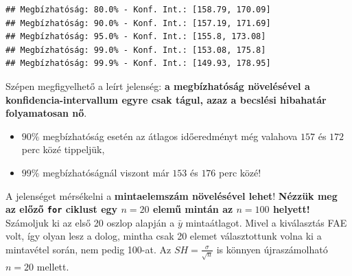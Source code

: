 \documentclass[
]{book}
\providecommand{\tightlist}{%
  \setlength{\itemsep}{0pt}\setlength{\parskip}{0pt}}
\begin{document}
\begin{verbatim}
## Megbízhatóság: 80.0% - Konf. Int.: [158.79, 170.09]
## Megbízhatóság: 90.0% - Konf. Int.: [157.19, 171.69]
## Megbízhatóság: 95.0% - Konf. Int.: [155.8, 173.08]
## Megbízhatóság: 99.0% - Konf. Int.: [153.08, 175.8]
## Megbízhatóság: 99.9% - Konf. Int.: [149.93, 178.95]
\end{verbatim}

Szépen megfigyelhető a leírt jelenség: \textbf{a megbízhatóság növelésével a konfidencia-intervallum egyre csak tágul, azaz a becslési hibahatár folyamatosan nő}.

\begin{itemize}
\tightlist
\item
  \(90\%\) megbízhatóság esetén az átlagos időeredményt még valahova \(157\) és \(172\) perc közé tippeljük,
\item
  \(99\%\) megbízhatóságnál viszont már \(153\) és \(176\) perc közé!
\end{itemize}

A jelenséget mérsékelni a \textbf{mintaelemszám növelésével lehet}! \textbf{Nézzük meg az előző \texttt{for} ciklust egy \(n=20\) elemű mintán az \(n=100\) helyett!} Számoljuk ki az első 20 oszlop alapján a \(\bar{y}\) mintaátlagot. Mivel a kiválasztás FAE volt, így olyan lesz a dolog, mintha csak 20 elemet választottunk volna ki a mintavétel során, nem pedig 100-at. Az \(SH=\frac{\sigma}{\sqrt{n}}\) is könnyen újraszámolható \(n=20\) mellett.
\end{document}

